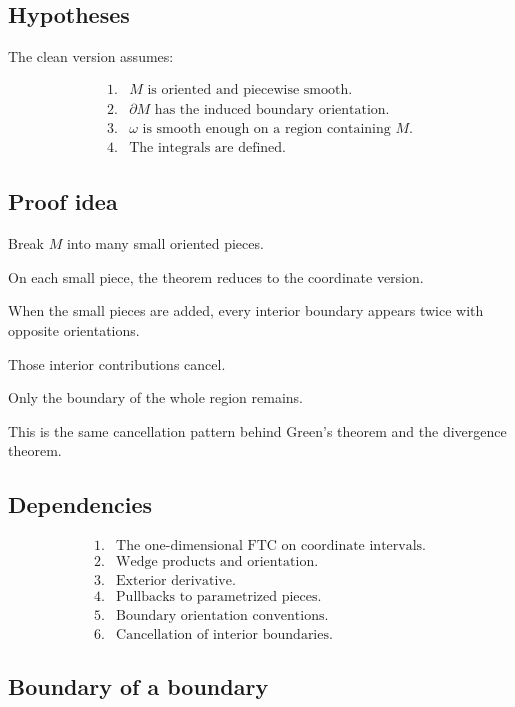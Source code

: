 \subsection*{Hypotheses}

The clean version assumes:

\[
\begin{array}{ll}
1. & M\text{ is oriented and piecewise smooth.}\\[1mm]
2. & \partial M\text{ has the induced boundary orientation.}\\[1mm]
3. & \omega\text{ is smooth enough on a region containing }M.\\[1mm]
4. & \text{The integrals are defined.}
\end{array}
\]

\subsection*{Proof idea}

Break \(M\) into many small oriented pieces.

On each small piece, the theorem reduces to the coordinate version.

When the small pieces are added, every interior boundary appears twice with opposite
orientations.

Those interior contributions cancel.

Only the boundary of the whole region remains.

This is the same cancellation pattern behind Green's theorem and the divergence theorem.

\subsection*{Dependencies}

\[
\begin{array}{ll}
1. & \text{The one-dimensional FTC on coordinate intervals.}\\[1mm]
2. & \text{Wedge products and orientation.}\\[1mm]
3. & \text{Exterior derivative.}\\[1mm]
4. & \text{Pullbacks to parametrized pieces.}\\[1mm]
5. & \text{Boundary orientation conventions.}\\[1mm]
6. & \text{Cancellation of interior boundaries.}
\end{array}
\]

\subsection*{Boundary of a boundary}

